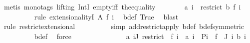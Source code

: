 \begin{isabellebody}
\ {\isacharparenleft}{\kern0pt}metis\ {\isacharparenleft}{\kern0pt}mono{\isacharunderscore}{\kern0pt}tags{\isacharcomma}{\kern0pt}\ lifting{\isacharparenright}{\kern0pt}\ IntI\ empty{\isacharunderscore}{\kern0pt}iff\ the{\isacharunderscore}{\kern0pt}equality{\isacharparenright}{\kern0pt}\isanewline
\ \ \ \ \ \ \isamarkupfalse%
\ {\isachardoublequoteopen}a\ i\ {\isacharequal}{\kern0pt}\ restrict\ b\ {\isacharparenleft}{\kern0pt}f\ i{\isacharparenright}{\kern0pt}{\isachardoublequoteclose}\isanewline
\ \ \ \ \ \ \ \ \isamarkupfalse%
\ {\isacharparenleft}{\kern0pt}rule\ extensionalityI{\isacharbrackleft}{\kern0pt}\ A\ {\isacharequal}{\kern0pt}{\isachardoublequoteopen}f\ i{\isachardoublequoteclose}{\isacharbrackright}{\kern0pt}{\isacharparenright}{\kern0pt}\ \isamarkupfalse%
\ b{\isacharunderscore}{\kern0pt}def{\isacharunderscore}{\kern0pt}{}\ True\ \isamarkupfalse%
\ blast\isanewline
\ \ \ \ \ \ \ \ \ \isamarkupfalse%
\ {\isacharparenleft}{\kern0pt}rule\ restrict{\isacharunderscore}{\kern0pt}extensional{\isacharparenright}{\kern0pt}\isanewline
\ \ \ \ \ \ \ \ \isamarkupfalse%
\ {\isacharparenleft}{\kern0pt}simp\ add{\isacharcolon}{\kern0pt}restrict{\isacharunderscore}{\kern0pt}apply{\isacharprime}{\kern0pt}\ b{\isacharunderscore}{\kern0pt}def\ b{\isacharunderscore}{\kern0pt}def{\isacharunderscore}{\kern0pt}{}{\isacharbrackleft}{\kern0pt}symmetric{\isacharbrackright}{\kern0pt}{\isacharparenright}{\kern0pt}\isanewline
\ \ \ \ \ \ \ \ \isamarkupfalse%
\ b{\isacharunderscore}{\kern0pt}def{\isacharunderscore}{\kern0pt}{}\ \isamarkupfalse%
\ force\isanewline
\ \ \ \ \isamarkupfalse%
\ \ \ \ \isanewline
\ \ \ \ \isamarkupfalse%
\ a{\isacharcolon}{\kern0pt}{\isachardoublequoteopen}{\isacharbraceleft}{\kern0pt}{\isasymomega}{\isachardot}{\kern0pt}\ {\isasymforall}i{\isasymin}J{\isacharprime}{\kern0pt}{\isachardot}{\kern0pt}\ restrict\ {\isasymomega}\ {\isacharparenleft}{\kern0pt}f\ i{\isacharparenright}{\kern0pt}\ {\isacharequal}{\kern0pt}\ a\ i{\isacharbraceright}{\kern0pt}\ {\isacharequal}{\kern0pt}\ Pi\ {\isacharparenleft}{\kern0pt}{\isasymUnion}\ {\isacharparenleft}{\kern0pt}f\ {\isacharbackquote}{\kern0pt}\ J{\isacharprime}{\kern0pt}{\isacharparenright}{\kern0pt}{\isacharparenright}{\kern0pt}\ {\isacharparenleft}{\kern0pt}{\isasymlambda}i{\isachardot}{\kern0pt}\ {\isacharbraceleft}{\kern0pt}b\ i{\isacharbraceright}{\kern0pt}{\isacharparenright}{\kern0pt}{\isachardoublequoteclose}\isanewline

\end{isabellebody}
